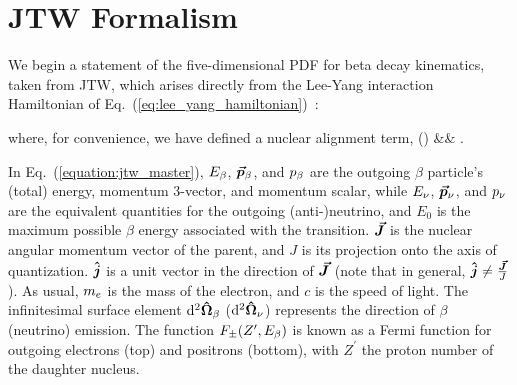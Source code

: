\section[JTW Formalism]{JTW Formalism}
\label{sec:jtw_formalism}
We begin a statement of the five-dimensional \ac{PDF} for beta decay kinematics, taken from \acf{JTW}, which arises directly from the Lee-Yang interaction Hamiltonian of Eq.~(\ref{eq:lee_yang_hamiltonian})~\cite{LeeYang}\cite{jtw}\cite{jtw_coulomb}:

where, for convenience, we have defined a nuclear alignment term,
\bea
\Talign(\vecJ) &\equiv& \TalignExpand.
\eea
{}

In Eq.~(\ref{equation:jtw_master}), $E_{\beta}$, $\bm{\vec{p}}_{\beta}$, and $p_{\beta}$ are the outgoing $\beta$ particle's (total) energy, momentum 3-vector, and momentum scalar, while $E_{\nu}$, $\bm{\vec{p}}_{\nu}$, and $p_{\nu}$ are the equivalent quantities for the outgoing (anti-)neutrino, and $E_0$ is the maximum possible $\beta$ energy associated with the transition.   $\bm{\vec{J}}$ is the nuclear angular momentum vector of the parent, and $J$ is its projection onto the axis of quantization. $\bm{\hat{j}}$ is a unit vector in the direction of $\bm{\vec{J}}$ (note that in general, $\bm{\hat{j}} \neq \frac{\bm{\vec{J}}}{J}$).  As usual, $m_e$ is the mass of the electron, and $c$ is the speed of light.  The infinitesimal surface element $\mathrm{d}^{2} \bm{\hat{\Omega}}_\beta$ ($\mathrm{d}^{2} \bm{\hat{\Omega}}_\nu$) represents the direction of $\beta$ (neutrino) emission.  The function $F_{\pm}(Z^\prime, E_\beta)$ is known as a Fermi function for outgoing electrons (top) and positrons (bottom), with $Z^\prime$ the proton number of the daughter nucleus.


